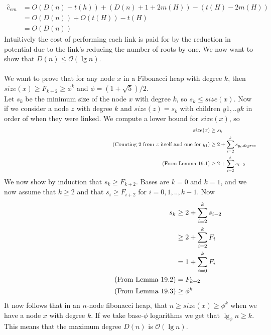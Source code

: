 \documentclass[a4paper]{article}
\newcommand{\comment}[1]{%
  \text{\phantom{(#1)}} \tag{#1}}
\begin{document}
\begin{align*}
  \hat{c}_{em}&=O(D(n)+t(h))+(D(n)+1+2m(H))-(t(H)-2m(H)) \\
              &=O(D(n))+O(t(H))-t(H) \\
              &=O(D(n))
\end{align*}
Intuitively the cost of performing each link is paid for by the reduction in potential due to the link's reducing the number of roots by one. We now want to show that $D(n)\leq \mathcal{O}(\lg n)$. \\
\\
We want to prove that for any node $x$ in a Fibonacci heap with degree $k$, then $size(x)\geq F_{k+2}\geq \phi^k$ and $\phi=(1+\sqrt{5})/2$. \\
Let $s_k$ be the minimum size of the node $x$ with degree $k$, so $s_k\leq size(x)$. Now if we consider a node $z$ with degree $k$ and $size(z)=s_k$ with children $y1,..yk$ in order of when they were linked. We compute a lower bound for $size(x)$, so
\begin{align*}
  size(x)&\geq s_k \\
  \comment{Counting 2 from $z$ itself and one for $y_1$}  &\geq 2+\sum_{i=2}^k s_{y_i.degree} \\
  \comment{From Lemma 19.1} &\geq 2+\sum_{i=2}^k s_{i-2}
\end{align*}
We now show by induction that $s_k\geq F_{k+2}$. Bases are $k=0$ and $k=1$, and we now assume that $k\geq 2$ and that $s_i\geq F_{i+2}$ for $i=0,1,..,k-1$. Now
\begin{align*}
  s_k&\geq 2+\sum_{i=2}^k s_{i-2} \\
     &\geq 2+\sum_{i=2}^k F_i \\
     &= 1+\sum_{i=0}^k F_i \\
\comment{From Lemma 19.2} &=F_{k+2} \\
\comment{From Lemma 19.3} &\geq \phi^k
\end{align*}
It now follows that in an $n$-node fibonacci heap, that $n\geq size(x)\geq \phi^k$ when we have a node $x$ with degree $k$. If we take base-$\phi$ logarithms we get that $\lg_\phi n\geq k$. This means that the maximum degree $D(n)$ is $\mathcal{O}(\lg n)$.
\end{document}
